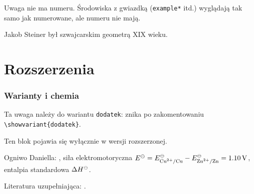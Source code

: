 \documentclass[a4paper, polish, 11pt]{scrartcl}
\begin{document}
\begin{remark}
Uwaga nie ma numeru. Środowiska z gwiazdką (\texttt{example*} itd.) wyglądają tak samo jak numerowane, ale numeru nie mają.
\end{remark}

\begin{aside}
Jakob Steiner był szwajcarskim geometrą XIX wieku.
\end{aside}

\part{Rozszerzenia}

\section{Warianty i chemia}\label{sec:warianty}

\begin{dodatek}
\begin{remark*}
Ta uwaga należy do wariantu \texttt{dodatek}: znika po zakomentowaniu \texttt{\textbackslash showvariant\{dodatek\}}.
\end{remark*}
\end{dodatek}

\begin{extended}
\begin{aside}
Ten blok pojawia się wyłącznie w wersji rozszerzonej.
\end{aside}
\end{extended}

Ogniwo Daniella: , siła elektromotoryczna $\Eo = \Eo_{\redox{Cu^2+}{Cu}} - \Eo_{\redox{Zn^2+}{Zn}} = \qty{1.10}{\volt}$, entalpia standardowa $\Delta H^{\ominus}$.


Literatura uzupełniająca: \cite{taylor,przyklad}.

\printbibliography
\end{document}
